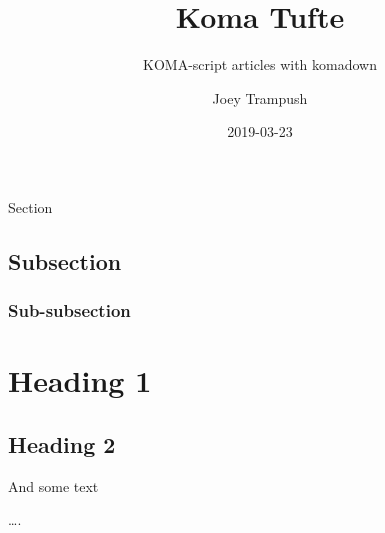 \documentclass[%
numbers=noendperiod,
parskip=half,
bibliography=totoc,
DIV=calc,headsepline=true,
]{scrartcl}
\title{Koma Tufte}
\subtitle{KOMA-script articles with komadown}
\author[]{Joey Trampush}
\date{2019-03-23}
\begin{document}
\maketitle



{
\hypersetup{linkcolor=}
\setcounter{tocdepth}{2}
\tableofcontents
}



Section

\hypertarget{subsection}{%
\subsection{Subsection}\label{subsection}}

\hypertarget{sub-subsection}{%
\subsubsection{Sub-subsection}\label{sub-subsection}}

\hypertarget{heading-1}{%
\section{Heading 1}\label{heading-1}}

\hypertarget{heading-2}{%
\subsection{Heading 2}\label{heading-2}}

And some text

\ldots.
\end{document}
